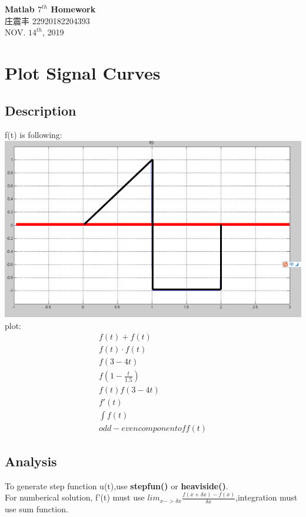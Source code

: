 \documentclass[UTF8,a4paper]{article}
\begin{document}
\begin{center}
    \textbf{\LARGE{Matlab $7^{th}$ Homework}}\\[0.5cm]
    \normalsize{庄震丰 22920182204393}\\[0.5cm]
    \large{NOV. $14^{th}$, 2019}
\end{center}
\section{Plot Signal Curves}
\subsection{Description}
f(t) is following:\\
\includegraphics[scale=0.5]{T1.png}
plot:
$$
\begin{aligned}
f(t)+f(t)\\
f(t)\cdot f(t)\\
f(3-4t)\\
f(1-\frac{t}{1.5})\\
f(t)f(3-4t)\\
f'(t)\\
\int f(t)\\
odd-even component of f(t)
\end{aligned}
$$
\subsection{Analysis}
\noindent To generate step function u(t),use \textbf{stepfun()} or \textbf{heaviside()}.\\
For numberical solution, f'(t) must use $lim_{x->\delta x} \frac{f(x+\delta x)-f(x)}{\delta x}$,integration must use sum function.\\
\end{document}
